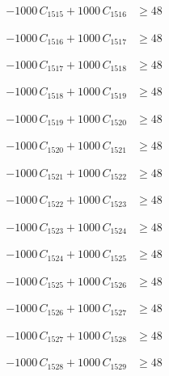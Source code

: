 \documentclass[a4paper,11pt]{article}
\begin{document}
\begin{align}
-1000\,C_{1515} + 1000\,C_{1516} &\geq 48 \nonumber
\end{align}

\begin{align}
-1000\,C_{1516} + 1000\,C_{1517} &\geq 48 \nonumber
\end{align}

\begin{align}
-1000\,C_{1517} + 1000\,C_{1518} &\geq 48 \nonumber
\end{align}

\begin{align}
-1000\,C_{1518} + 1000\,C_{1519} &\geq 48 \nonumber
\end{align}

\begin{align}
-1000\,C_{1519} + 1000\,C_{1520} &\geq 48 \nonumber
\end{align}

\begin{align}
-1000\,C_{1520} + 1000\,C_{1521} &\geq 48 \nonumber
\end{align}

\begin{align}
-1000\,C_{1521} + 1000\,C_{1522} &\geq 48 \nonumber
\end{align}

\begin{align}
-1000\,C_{1522} + 1000\,C_{1523} &\geq 48 \nonumber
\end{align}

\begin{align}
-1000\,C_{1523} + 1000\,C_{1524} &\geq 48 \nonumber
\end{align}

\begin{align}
-1000\,C_{1524} + 1000\,C_{1525} &\geq 48 \nonumber
\end{align}

\begin{align}
-1000\,C_{1525} + 1000\,C_{1526} &\geq 48 \nonumber
\end{align}

\begin{align}
-1000\,C_{1526} + 1000\,C_{1527} &\geq 48 \nonumber
\end{align}

\begin{align}
-1000\,C_{1527} + 1000\,C_{1528} &\geq 48 \nonumber
\end{align}

\begin{align}
-1000\,C_{1528} + 1000\,C_{1529} &\geq 48 \nonumber
\end{align}
\end{document}
